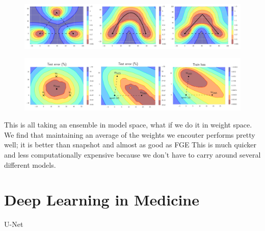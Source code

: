 \begin{figure}
    \centering
    \includegraphics[width=\textwidth]{./img/FGE.png}
    \caption{\cite{Garipov_Izmailov_Podoprikhin_Vetrov_Wilson_2018}}
    \label{fig:FGE_shortest_path}
\end{figure}

\begin{figure}
    \centering
    \includegraphics[width=\textwidth]{./img/SWA.png}
    \caption{\cite{Izmailov_Podoprikhin_Garipov_Vetrov_Wilson_2018}}
    \label{fig:SWA}
\end{figure}

This is all taking an ensemble in model space, what if we do it in weight space.
We find that maintaining an average of the weights we encouter performs pretty well; it is better than snapshot and almost as good as FGE
This is much quicker and less computationally expensive because we don't have to carry around several different models.

\section{Deep Learning in Medicine}\label{deep_learning_medic_lit}
U-Net \cite{Ronneberger_Fischer_Brox_2015}